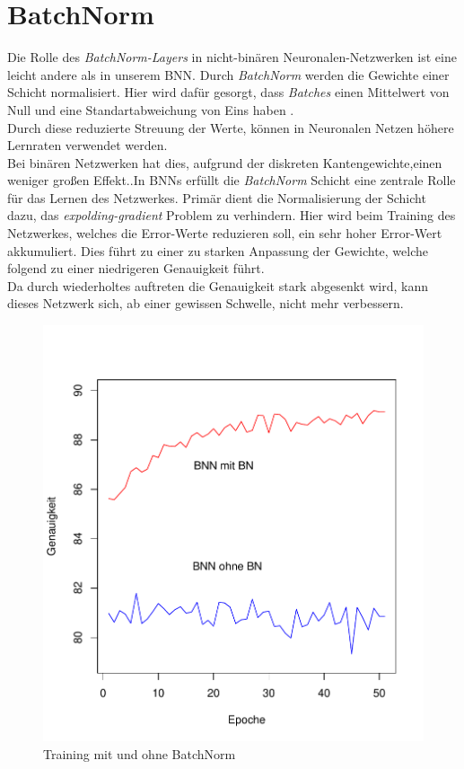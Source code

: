 \section{BatchNorm}
Die Rolle des \textit{BatchNorm-Layers} in nicht-binären Neuronalen-Netzwerken ist eine leicht andere als in unserem BNN. Durch \textit{BatchNorm} werden die Gewichte einer Schicht normalisiert. Hier wird dafür gesorgt, dass \textit{Batches} einen Mittelwert von Null und eine Standartabweichung von Eins haben\cite{batchnorm} .\\ 
Durch diese reduzierte Streuung der Werte, können in Neuronalen Netzen höhere Lernraten verwendet werden.\\
Bei binären Netzwerken hat dies, aufgrund der diskreten Kantengewichte,einen weniger großen Effekt..In BNNs erfüllt die \textit{BatchNorm} Schicht eine zentrale Rolle für das Lernen des Netzwerkes. Primär dient die Normalisierung der Schicht dazu, das \textit{expolding-gradient} Problem zu verhindern. Hier wird beim Training des Netzwerkes, welches die Error-Werte reduzieren soll, ein sehr hoher Error-Wert akkumuliert. Dies führt zu einer zu starken Anpassung der Gewichte, welche folgend zu einer niedrigeren Genauigkeit führt\cite{DBLP:journals/corr/abs-1909-09139}.\\
 Da durch wiederholtes auftreten die Genauigkeit stark abgesenkt wird, kann dieses Netzwerk sich, ab einer gewissen Schwelle, nicht mehr verbessern.
\begin{figure}[h]
	\centering
	\includegraphics[scale=0.7]{./bilder/_plot_batchnorm}
	\caption{Training mit und ohne BatchNorm}
	\label{fig:bn}
\end{figure}\\
